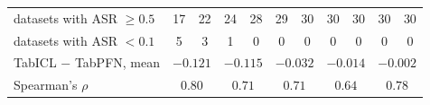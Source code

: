 {\begin{tabular}{@{}lcccccccccc@{}}
datasets with ASR $\geq 0.5$ & 17 & 22 & 24 & 28 & 29 & 30 & 30 & 30 & 30 & 30 \\
datasets with ASR $< 0.1$ & 5 & 3 & 1 & 0 & 0 & 0 & 0 & 0 & 0 & 0 \\
TabICL $-$ TabPFN, mean & \multicolumn{2}{c}{$-0.121$} & \multicolumn{2}{c}{$-0.115$} & \multicolumn{2}{c}{$-0.032$} & \multicolumn{2}{c}{$-0.014$} & \multicolumn{2}{c}{$-0.002$} \\
Spearman's $\rho$ & \multicolumn{2}{c}{$0.80$} & \multicolumn{2}{c}{$0.71$} & \multicolumn{2}{c}{$0.71$} & \multicolumn{2}{c}{$0.64$} & \multicolumn{2}{c}{$0.78$} \\
\bottomrule\end{tabular}}
